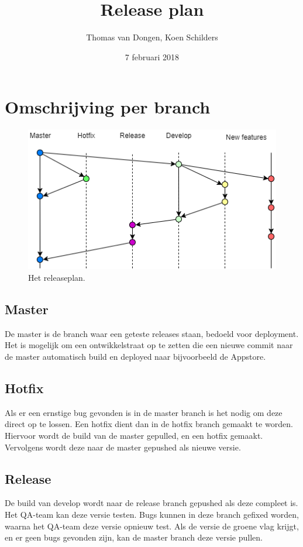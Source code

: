 \documentclass[12pt]{article}
\title{Release plan}
\author{Thomas van Dongen, Koen Schilders}
\date{7 februari 2018}
\begin{document}
\begin{titlepage}
\maketitle
\end{titlepage}



\section{Omschrijving per branch}
\begin{figure}[H]
	\includegraphics[width=\textwidth]{images/SOP6_Release.png}
	\caption{Het releaseplan.}
\end{figure}
\subsection{Master}
De master is de branch waar een geteste releases staan, bedoeld voor deployment. Het is mogelijk om een ontwikkelstraat op te zetten die een nieuwe commit naar de master automatisch build en deployed naar bijvoorbeeld de Appstore.
\subsection{Hotfix}
Als er een ernstige bug gevonden is in de master branch is het nodig om deze direct op te lossen. Een hotfix dient dan in de hotfix branch gemaakt te worden. Hiervoor wordt de build van de master gepulled, en een hotfix gemaakt. Vervolgens wordt deze naar de master gepushed als nieuwe versie.
\subsection{Release}
De build van develop wordt naar de release branch gepushed als deze compleet is. Het QA-team kan deze versie testen. Bugs kunnen in deze branch gefixed worden, waarna het QA-team deze versie opnieuw test. Als de versie de groene vlag krijgt, en er geen bugs gevonden zijn, kan de master branch deze versie pullen.
\end{document}
